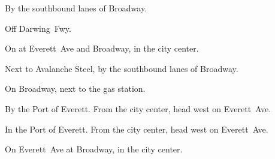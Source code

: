 
\begin{LocationList}

By the southbound lanes of  Broadway.

Off  Darwing~Fwy.

\Location{\GasStation \Gas}
On  at Everett~Ave and Broadway, in the city center.

Next to Avalanche Steel, by the southbound lanes of  Broadway.

\Location{\RestArea \Rest}
On  Broadway, next to the gas station.

By the Port of Everett.
From the city center, head west on Everett~Ave.

In the Port of Everett.
From the city center, head west on Everett~Ave.

On  Everett~Ave at Broadway, in the city center.

\end{LocationList}
